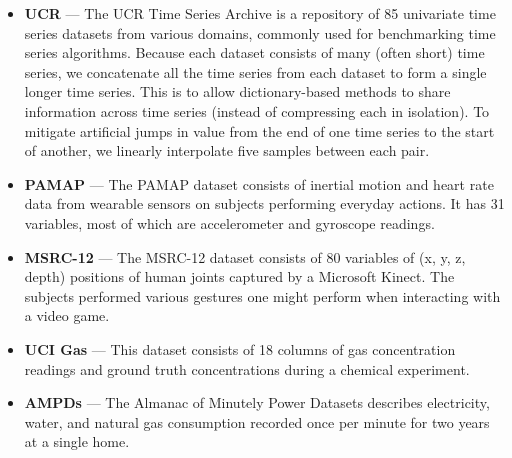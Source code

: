 \begin{itemize}[leftmargin=4mm]
\itemsep0mm
\item \textbf{UCR} \cite{ucrTimeSeries} --- The UCR Time Series Archive is a repository of 85 univariate time series datasets from various domains, commonly used for benchmarking time series algorithms. Because each dataset consists of many (often short) time series, we concatenate all the time series from each dataset to form a single longer time series. This is to allow dictionary-based methods to share information across time series (instead of compressing each in isolation). To mitigate artificial jumps in value from the end of one time series to the start of another, we linearly interpolate five samples between each pair.
\item \textbf{PAMAP} \cite{pamap} --- The PAMAP dataset consists of inertial motion and heart rate data from wearable sensors on subjects performing everyday actions. It has 31 variables, most of which are accelerometer and gyroscope readings.
\item \textbf{MSRC-12} \cite{msrc} --- The MSRC-12 dataset consists of 80 variables of (x, y, z, depth) positions of human joints captured by a Microsoft Kinect. The subjects performed various gestures one might perform when interacting with a video game.
\item \textbf{UCI Gas} \cite{uci_gas} --- This dataset consists of 18 columns of gas concentration readings and ground truth concentrations during a chemical experiment.
\item \textbf{AMPDs} \cite{ampds} --- The Almanac of Minutely Power Datasets describes electricity, water, and natural gas consumption recorded once per minute for two years at a single home. %
\end{itemize}

